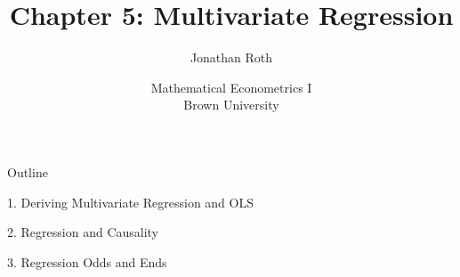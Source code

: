 \documentclass[11pt,english,handout]{beamer}
\begin{document}
	
	\begin{frame}[noframenumbering]{}
		\vspace{0.5cm}
		\title[]{Chapter 5: Multivariate Regression}
		\author{Jonathan Roth}
		\date{Mathematical Econometrics I \\ Brown University\\} 
		\titlepage {\small{}\ }\thispagestyle{empty} \vspace{-30pt}
		
	\end{frame}
	
	
	\begin{frame}{Outline}

	1. Deriving Multivariate Regression and OLS
	\vspace{0.8cm}
	
	2. Regression and Causality
	\vspace{0.8cm}
	
	3. Regression Odds and Ends
	
	\end{frame}
		
\end{document}
